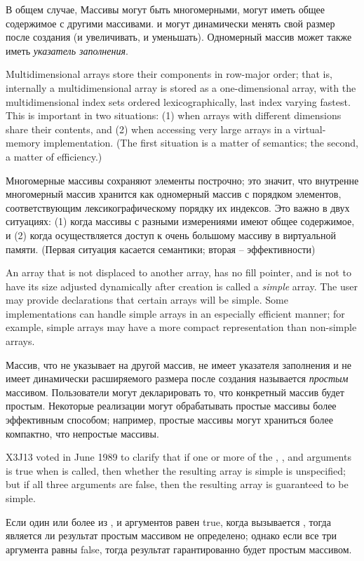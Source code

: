 В общем случае, Массивы могут быть многомерными, могут иметь общее содержимое с
другими массивами. и могут динамически менять свой размер после создания (и
увеличивать, и уменьшать).
Одномерный массив может также иметь {\it указатель заполнения}.

Multidimensional arrays store their components in row-major order;
that is, internally a multidimensional array is stored as a one-dimensional
array, with the multidimensional index sets ordered lexicographically,
last index varying fastest.  This is important in two situations:
(1) when arrays with different dimensions share their contents, and
(2) when accessing very large arrays in a virtual-memory implementation.
(The first situation is a matter of semantics; the second, a matter
of efficiency.)

Многомерные массивы сохраняют элементы построчно;
это значит, что внутренне многомерный массив хранится как одномерный массив с
порядком элементов, соответствующим лексикографическому порядку их индексов. Это
важно в двух ситуациях:
(1) когда массивы с разными измерениями имеют общее содержимое, и 
(2) когда осуществляется доступ к очень большому массиву в виртуальной памяти.
(Первая ситуация касается семантики; вторая -- эффективности)

An array that is not displaced to another array, has no fill pointer, and
is not to have its size adjusted dynamically after creation is called a
{\it simple} array.  The user may provide declarations that certain arrays
will be simple.  Some implementations can handle simple arrays in an
especially efficient manner; for example, simple arrays may have a more
compact representation than non-simple arrays.

Массив, что не указывает на другой массив, не имеет указателя заполнения и не
имеет динамически расширяемого размера после создания называется {\it простым}
массивом. Пользователи могут декларировать то, что конкретный массив будет
простым. Некоторые реализации могут обрабатывать простые массивы более
эффективным способом; например, простые массивы могут храниться более компактно,
что непростые массивы. 

\begin{newer}
X3J13 voted in June 1989
to clarify that if one or more of the , ,
and  arguments is true when 
is called, then whether the resulting
array is simple is unspecified; but if all three arguments are false,
then the resulting array is guaranteed to be simple.

Если один или более из ,  и
 аргументов равен true, когда вызывается ,
тогда является ли результат простым массивом не определено; однако если все три
аргумента равны false, тогда результат гарантированно будет простым массивом.
\end{newer}

